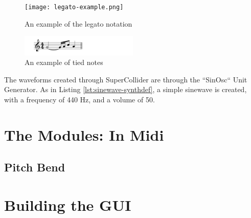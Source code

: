 \begin{figure}
  \centering
  \texttt{[image: legato-example.png]}
  \caption{An example of the legato notation}
  \label{fig:legato-example}
\end{figure}

\begin{figure}
  \centering
  \includegraphics[width=0.5\textwidth]{figures/tied-notes-example.png}
  \caption{An example of tied notes}
  \label{fig:tied-notes-example}
\end{figure}

The waveforms created through SuperCollider are through the ``SinOsc`` Unit Generator. As in Listing \ref{lst:sinewave-synthdef}, a simple sinewave is created, with a frequency of 440 Hz, and a volume of 50.


\section{The Modules: In Midi}\label{section:the-modules-midi}

\subsection{Pitch Bend}

\section{Building the GUI}\label{section:building-the-gui}